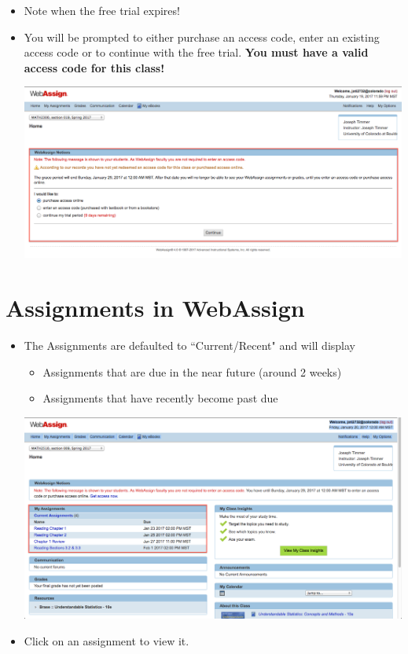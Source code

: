 \documentclass{article}
\begin{document}
\begin{itemize}
\item Note when the free trial expires!

\item You will be prompted to either purchase an access code, enter an existing access code or to continue with the free trial. \textbf{You must have a valid access code for this class!}

\begin{center}
\includegraphics[scale=0.25]{money.png}
\end{center}

\end{itemize}


\section*{Assignments in WebAssign}

\begin{itemize}

\item The Assignments are defaulted to ``Current/Recent" and will display \begin{itemize} \item Assignments that are due in the near future (around 2 weeks) \item Assignments that have recently become past due \end{itemize}

\begin{center}
\includegraphics[scale=0.25]{classhome.png}
\end{center}

\item Click on an assignment to view it.

\end{itemize}
\end{document}
